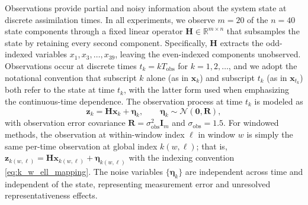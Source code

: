 \documentclass[11pt,a4paper]{article}
\begin{document}
Observations provide partial and noisy information about the system state at discrete assimilation times. In all experiments, we observe $m=20$ of the $n=40$ state components through a fixed linear operator $\mathbf{H}\in\mathbb{R}^{m\times n}$ that subsamples the state by retaining every second component. Specifically, $\mathbf{H}$ extracts the odd-indexed variables $x_1,x_3,\ldots,x_{39}$, leaving the even-indexed components unobserved. Observations occur at discrete times $t_k = kT_{\mathrm{obs}}$ for $k=1,2,\ldots$, and we adopt the notational convention that subscript $k$ alone (as in $\mathbf{x}_k$) and subscript $t_k$ (as in $\mathbf{x}_{t_k}$) both refer to the state at time $t_k$, with the latter form used when emphasizing the continuous-time dependence. The observation process at time $t_k$ is modeled as
\begin{equation}
\mathbf{z}_k
=
\mathbf{H}\mathbf{x}_{k}+\boldsymbol{\eta}_k,
\qquad
\boldsymbol{\eta}_k\sim\mathcal{N}(\mathbf{0},\mathbf{R}),
\label{eq:obs_model}
\end{equation}
with observation error covariance $\mathbf{R}=\sigma_{\mathrm{obs}}^2\mathbf{I}_m$ and $\sigma_{\mathrm{obs}}=1.5$. For windowed methods, the observation at within-window index $\ell$ in window $w$ is simply the same per-time observation at global index $k(w,\ell)$; that is, $\mathbf{z}_{k(w,\ell)}=\mathbf{H}\mathbf{x}_{k(w,\ell)}+\boldsymbol{\eta}_{k(w,\ell)}$ with the indexing convention \eqref{eq:k_w_ell_mapping}. The noise variables $\{\boldsymbol{\eta}_{k}\}$ are independent across time and independent of the state, representing measurement error and unresolved representativeness effects.
\end{document}
